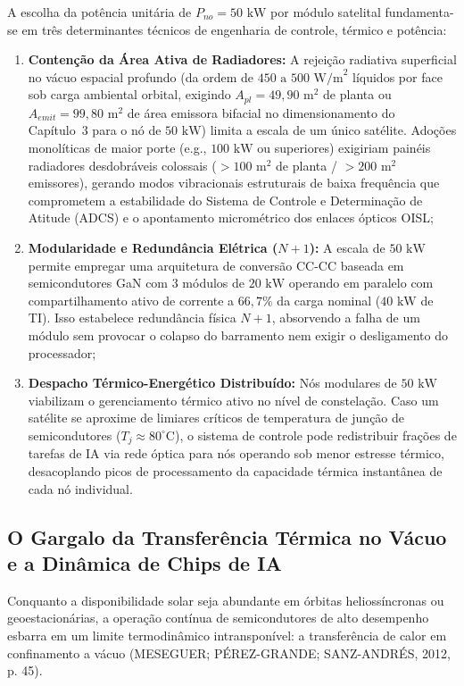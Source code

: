 A escolha da potência unitária de $P_{no} = 50\text{ kW}$ por módulo satelital fundamenta-se em três determinantes técnicos de engenharia de controle, térmico e potência:
\begin{enumerate}
    \item \textbf{Contenção da Área Ativa de Radiadores:} A rejeição radiativa superficial no vácuo espacial profundo (da ordem de $450\text{ a }500\text{ W/m}^2$ líquidos por face sob carga ambiental orbital, exigindo $A_{pl} = 49{,}90\text{ m}^2$ de planta ou $A_{emit} = 99{,}80\text{ m}^2$ de área emissora bifacial no dimensionamento do Capítulo~3 para o nó de $50\text{ kW}$) limita a escala de um único satélite. Adoções monolíticas de maior porte (e.g., $100\text{ kW}$ ou superiores) exigiriam painéis radiadores desdobráveis colossais ($> 100\text{ m}^2$ de planta / $> 200\text{ m}^2$ emissores), gerando modos vibracionais estruturais de baixa frequência que comprometem a estabilidade do Sistema de Controle e Determinação de Atitude (ADCS) e o apontamento micrométrico dos enlaces ópticos OISL;
    \item \textbf{Modularidade e Redundância Elétrica ($N+1$):} A escala de $50\text{ kW}$ permite empregar uma arquitetura de conversão CC-CC baseada em semicondutores GaN com 3 módulos de $20\text{ kW}$ operando em paralelo com compartilhamento ativo de corrente a $66{,}7\%$ da carga nominal ($40\text{ kW}$ de TI). Isso estabelece redundância física $N+1$, absorvendo a falha de um módulo sem provocar o colapso do barramento nem exigir o desligamento do processador;
    \item \textbf{Despacho Térmico-Energético Distribuído:} Nós modulares de $50\text{ kW}$ viabilizam o gerenciamento térmico ativo no nível de constelação. Caso um satélite se aproxime de limiares críticos de temperatura de junção de semicondutores ($T_j \approx 80^\circ\text{C}$), o sistema de controle pode redistribuir frações de tarefas de IA via rede óptica para nós operando sob menor estresse térmico, desacoplando picos de processamento da capacidade térmica instantânea de cada nó individual.
\end{enumerate}

\subsection{O Gargalo da Transferência Térmica no Vácuo e a Dinâmica de Chips de IA}

Conquanto a disponibilidade solar seja abundante em órbitas heliossíncronas ou geoestacionárias, a operação contínua de semicondutores de alto desempenho esbarra em um limite termodinâmico intransponível: a transferência de calor em confinamento a vácuo (MESEGUER; PÉREZ-GRANDE; SANZ-ANDRÉS, 2012, p. 45).

